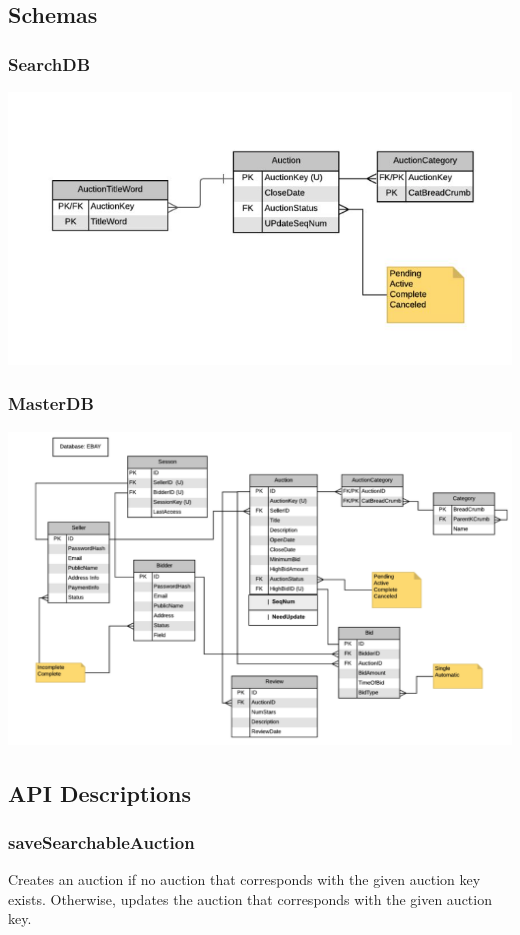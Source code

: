 \documentclass[12pt,a4paper]{article}
\begin{document}
\subsection{Schemas}

\subsubsection{SearchDB}
\includegraphics[scale=0.5]{images/search-schema.png}
\subsubsection{MasterDB}
\includegraphics[scale=0.35]{images/master-schema.png}
\pagebreak
\subsection{API Descriptions}

\subsubsection{saveSearchableAuction}
\label{ref:csa}
Creates an auction if no auction that corresponds with the given auction key exists.
Otherwise, updates the auction that corresponds with the given auction key. 
\end{document}
